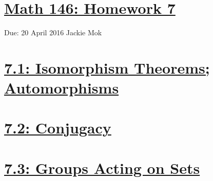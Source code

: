 \documentclass{article}
\begin{document}
\section*{\underline{Math 146: Homework 7}}
Due: 20 April 2016
\newline Jackie Mok

\vspace{10 mm}
\section*{\underline{7.1: Isomorphism Theorems; Automorphisms}}



\section*{\underline{7.2: Conjugacy}}



\section*{\underline{7.3: Groups Acting on Sets}}





\end{document}
